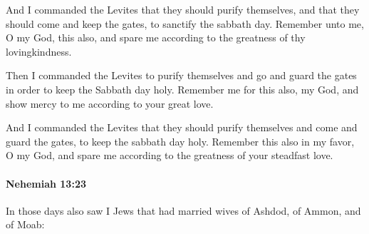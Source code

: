 			\begin{versebox}
					\item[BHS] 
					\item[LXX] 
					\item[ASV] And I commanded the Levites that they should purify themselves, and that they should come and keep the gates, to sanctify the sabbath day. Remember unto me, O my God, this also, and spare me according to the greatness of thy lovingkindness.
					\item[NIV] Then I commanded the Levites to purify themselves and go and guard the gates in order to keep the Sabbath day holy. Remember me for this also, my God, and show mercy to me according to your great love.
					\item[NRSV] And I commanded the Levites that they should purify themselves and come and guard the gates, to keep the sabbath day holy. Remember this also in my favor, O my God, and spare me according to the greatness of your steadfast love.
			\end{versebox}

		\paragraph{Nehemiah 13:23} %
			\label{NEHEMIAH-13-23}

			In those days also saw I Jews that had married wives of Ashdod, of Ammon, and of Moab:

